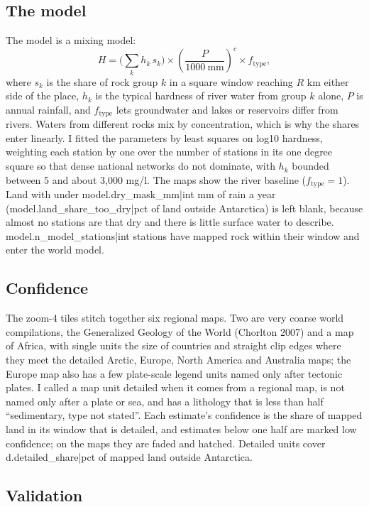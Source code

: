 \documentclass[11pt,a4paper]{article}
\begin{document}
\subsection{The model}

The model is a mixing model:
\[ H = \Big(\sum_k h_k\, s_k\Big) \times \left(\frac{P}{1000\ \mathrm{mm}}\right)^{c} \times f_{\mathrm{type}}, \]
where $s_k$ is the share of rock group $k$ in a square window reaching $R$ km either side of the place, $h_k$ is the typical hardness of river water from group $k$ alone, $P$ is annual rainfall, and $f_{\mathrm{type}}$ lets groundwater and lakes or reservoirs differ from rivers. Waters from different rocks mix by concentration, which is why the shares enter linearly. I fitted the parameters by least squares on log10 hardness, weighting each station by one over the number of stations in its one degree square so that dense national networks do not dominate, with $h_k$ bounded between 5 and about 3,000 mg/l. The maps show the river baseline ($f_{\mathrm{type}} = 1$). Land with under {{model.dry_mask_mm|int}} mm of rain a year ({{model.land_share_too_dry|pct}} of land outside Antarctica) is left blank, because almost no stations are that dry and there is little surface water to describe. {{model.n_model_stations|int}} stations have mapped rock within their window and enter the world model.

\subsection{Confidence}

The zoom-4 tiles stitch together six regional maps. Two are very coarse world compilations, the Generalized Geology of the World (Chorlton 2007) and a map of Africa, with single units the size of countries and straight clip edges where they meet the detailed Arctic, Europe, North America and Australia maps; the Europe map also has a few plate-scale legend units named only after tectonic plates. I called a map unit detailed when it comes from a regional map, is not named only after a plate or sea, and has a lithology that is less than half ``sedimentary, type not stated''. Each estimate's confidence is the share of mapped land in its window that is detailed, and estimates below one half are marked low confidence; on the maps they are faded and hatched. Detailed units cover {{d.detailed_share|pct}} of mapped land outside Antarctica.

\subsection{Validation}
\end{document}
